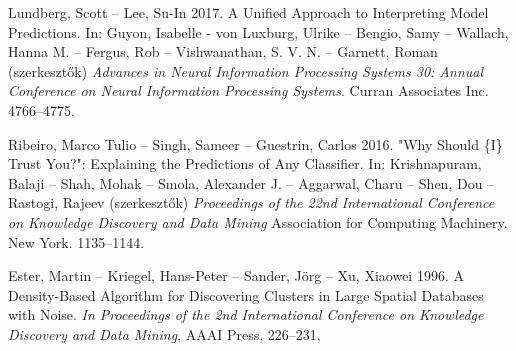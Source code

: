 \documentclass[12pt]{article}
\begin{document}
\begin{thebibliography}{9}
Lundberg, Scott -- Lee, Su-In 2017. A Unified Approach to Interpreting Model Predictions. In: Guyon, Isabelle - von Luxburg, Ulrike -- Bengio, Samy -- Wallach, Hanna M. -- Fergus, Rob -- Vishwanathan, S. V. N. -- Garnett, Roman (szerkesztők) \textit{Advances in Neural Information Processing Systems 30: Annual Conference on Neural Information Processing Systems}. Curran Associates Inc. 4766--4775.

Ribeiro, Marco Tulio -- Singh, Sameer -- Guestrin, Carlos 2016. "Why Should \{I\} Trust You?": Explaining the Predictions of Any Classifier. In: Krishnapuram, Balaji -- Shah, Mohak -- Smola, Alexander J. -- Aggarwal, Charu -- Shen, Dou -- Rastogi, Rajeev (szerkesztők) \textit{Proceedings of the 22nd International Conference on Knowledge Discovery and Data Mining} Association for Computing Machinery. New York. 1135--1144. 

Ester, Martin -- Kriegel, Hans-Peter -- Sander, Jörg -- Xu, Xiaowei  1996. A Density-Based Algorithm for Discovering Clusters in Large Spatial Databases with Noise.  \textit{In Proceedings of the 2nd International Conference on Knowledge Discovery and Data Mining}, AAAI Press, 226--231, 

\end{thebibliography}
\end{document}
